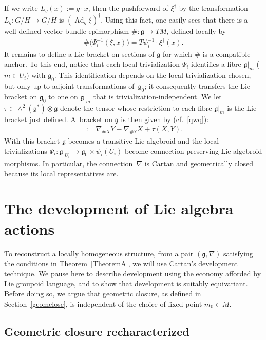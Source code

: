 \documentclass[pdftex]{sigma}
\DeclareMathOperator{\Adjoint}{Ad}
\numberwithin{equation}{section}
\begin{document}
If we write $L_g(x):=g\cdot x$, then the pushforward of $\xi^\dagger$
by the transformation $L_g \colon G/H \rightarrow G/H$ is $(\Adjoint_g
\xi)^\dagger$. Using this fact, one easily sees that there is a
well-def\/ined vector bundle epimorphism $\# \colon {\mathfrak
  g} \rightarrow TM$, def\/ined locally by
\begin{gather*}
  \#\big(\Psi_i^{-1}(\xi,x)\big)=T \psi_i^{-1}\cdot \xi^\dagger(x).
\end{gather*}
It remains to def\/ine a Lie bracket on sections of $\mathfrak g$ for
which $\#$ is a compatible anchor. To this end, notice that each local
trivialization $\Psi_i$ identif\/ies a f\/ibre ${\mathfrak g}|_m$ ($m\in
U_i$) with ${\mathfrak g}_0$. This identif\/ication depends on the local
trivialization chosen, but only up to adjoint transformations of~${\mathfrak g}_0$; it consequently transfers the Lie bracket on
${\mathfrak g}_0$ to one on ${\mathfrak g}|_m$ that is
trivialization-independent. We let $\tau\in\wedge^2({\mathfrak
  g}^*)\otimes {\mathfrak g}$ denote the tensor whose restriction to
each f\/ibre ${\mathfrak g}|_m$ is the Lie bracket just def\/ined. A~bracket on ${\mathfrak g}$ is then given by
(cf.~\eqref{qwq}):
\begin{gather*}
  [ X, Y]:=\nabla_{\#X}Y-\nabla_{\#Y}X+\tau (X,Y).%
\end{gather*}
With this bracket $\mathfrak g$ becomes a transitive Lie algebroid and
the local trivializations $\Psi_i \colon {\mathfrak g}|_{U_i}
\rightarrow {\mathfrak g}_0 \times \psi_i(U_i)$ become
connection-preserving Lie algebroid morphisms. In particular, the
connec\-tion~$\nabla$ is Cartan and geometrically closed because its
local representatives are.

\section{The development of Lie algebra actions}\label{smoothact}
To reconstruct a locally homogeneous structure, from a pair
$({\mathfrak g},\nabla)$ satisfying the conditions in Theorem~\ref{TheoremA}, we
will use Cartan's development technique. We pause here to describe
development using the economy af\/forded by Lie groupoid language, and
to show that development is suitably equivariant. Before doing so, we
argue that geometric closure, as def\/ined in Section~\ref{geomclose}, is
independent of the choice of f\/ixed point $m_0 \in M$.

\subsection{Geometric closure recharacterized}\label{hudo}
\end{document}

